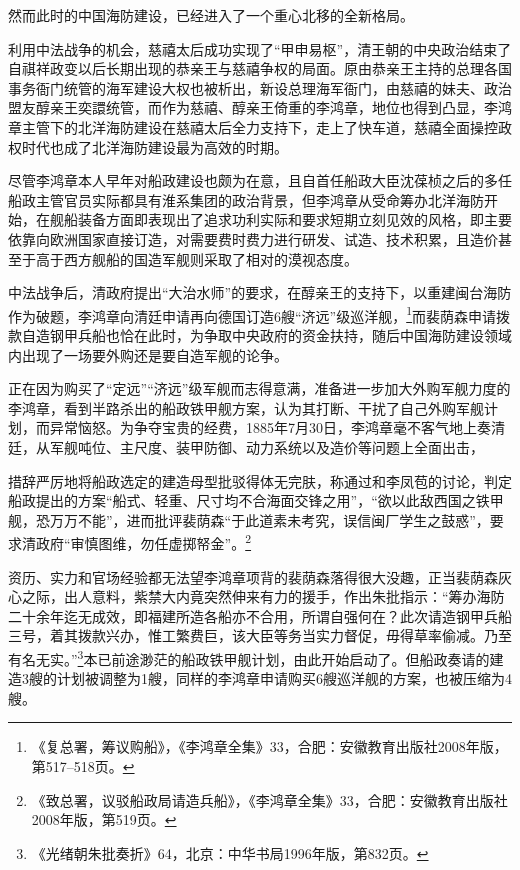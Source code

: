 \documentclass[12pt,UTF8]{ctexbook}
\begin{document}
然而此时的中国海防建设，已经进入了一个重心北移的全新格局。

利用中法战争的机会，慈禧太后成功实现了“甲申易枢”，清王朝的中央政治结束了自祺祥政变以后长期出现的恭亲王与慈禧争权的局面。原由恭亲王主持的总理各国事务衙门统管的海军建设大权也被析出，新设总理海军衙门，由慈禧的妹夫、政治盟友醇亲王奕譞统管，而作为慈禧、醇亲王倚重的李鸿章，地位也得到凸显，李鸿章主管下的北洋海防建设在慈禧太后全力支持下，走上了快车道，慈禧全面操控政权时代也成了北洋海防建设最为高效的时期。

尽管李鸿章本人早年对船政建设也颇为在意，且自首任船政大臣沈葆桢之后的多任船政主管官员实际都具有淮系集团的政治背景，但李鸿章从受命筹办北洋海防开始，在舰船装备方面即表现出了追求功利实际和要求短期立刻见效的风格，即主要依靠向欧洲国家直接订造，对需要费时费力进行研发、试造、技术积累，且造价甚至于高于西方舰船的国造军舰则采取了相对的漠视态度。

中法战争后，清政府提出“大治水师”的要求，在醇亲王的支持下，以重建闽台海防作为破题，李鸿章向清廷申请再向德国订造6艘“济远”级巡洋舰，\footnote{《复总署，筹议购船》，《李鸿章全集》33，合肥：安徽教育出版社2008年版，第517--518页。}而裴荫森申请拨款自造钢甲兵船也恰在此时，为争取中央政府的资金扶持，随后中国海防建设领域内出现了一场要外购还是要自造军舰的论争。

正在因为购买了“定远”“济远”级军舰而志得意满，准备进一步加大外购军舰力度的李鸿章，看到半路杀出的船政铁甲舰方案，认为其打断、干扰了自己外购军舰计划，而异常恼怒。为争夺宝贵的经费，1885年7月30日，李鸿章毫不客气地上奏清廷，从军舰吨位、主尺度、装甲防御、动力系统以及造价等问题上全面出击，

措辞严厉地将船政选定的建造母型批驳得体无完肤，称通过和李凤苞的讨论，判定船政提出的方案“船式、轻重、尺寸均不合海面交锋之用”，“欲以此敌西国之铁甲舰，恐万万不能”，进而批评裴荫森“于此道素未考究，误信闽厂学生之鼓惑”，要求清政府“审慎图维，勿任虚掷帑金”。\footnote{《致总署，议驳船政局请造兵船》，《李鸿章全集》33，合肥：安徽教育出版社2008年版，第519页。}

资历、实力和官场经验都无法望李鸿章项背的裴荫森落得很大没趣，正当裴荫森灰心之际，出人意料，紫禁大内竟突然伸来有力的援手，作出朱批指示：“筹办海防二十余年迄无成效，即福建所造各船亦不合用，所谓自强何在？此次请造钢甲兵船三号，着其拨款兴办，惟工繁费巨，该大臣等务当实力督促，毋得草率偷减。乃至有名无实。”\footnote{《光绪朝朱批奏折》64，北京：中华书局1996年版，第832页。}本已前途渺茫的船政铁甲舰计划，由此开始启动了。但船政奏请的建造3艘的计划被调整为1艘，同样的李鸿章申请购买6艘巡洋舰的方案，也被压缩为4艘。
\end{document}
